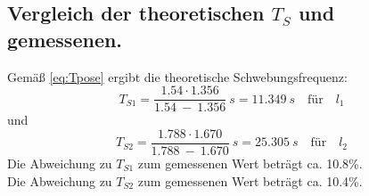 \subsection{Vergleich der theoretischen $T_S$ und gemessenen.}
Gemäß \autoref{eq:Tpose} ergibt die theoretische Schwebungsfrequenz:
\begin{equation}
  T_{S1} = \frac{1.54\cdot 1.356}{1.54\ -\ 1.356}\ s = 11.349\ s \quad\textrm{für}\quad l_1
\end{equation}
und
\begin{equation}
  T_{S2} = \frac{1.788\cdot 1.670}{1.788\ -\ 1.670}\ s = 25.305\ s \quad\textrm{für}\quad l_2
\end{equation}
Die Abweichung zu $T_{S1}$ zum gemessenen Wert beträgt ca. 10.8\%.\\
Die Abweichung zu $T_{S2}$ zum gemessenen Wert beträgt ca. 10.4\%.\\